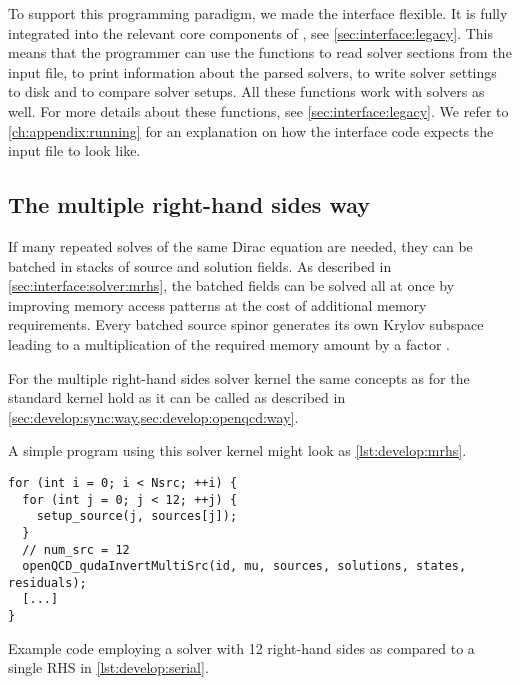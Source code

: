 To support this programming paradigm, we made the interface flexible. %
It is fully integrated into the relevant core components of \openqxd, see \cref{sec:interface:legacy}.
This means that the programmer can use the functions  to read solver sections from the input file,  to print information about the parsed solvers,  to write solver settings to disk and  to compare solver setups.
All these functions work with \quda solvers as well.
For more details about these functions, see \cref{sec:interface:legacy}.
We refer to \cref{ch:appendix:running} for an explanation on how the \quda interface code expects the input file to look like.

\subsection{The multiple right-hand sides way}
\label{sec:develop:mrhs:way}

If many repeated solves of the same Dirac equation are needed, they can be batched in stacks of  source and solution fields.
As described in \cref{sec:interface:solver:mrhs}, the batched fields can be solved all at once by improving memory access patterns at the cost of additional memory requirements.
Every batched source spinor generates its own Krylov subspace leading to a multiplication of the required memory amount by a factor .

For the multiple right-hand sides solver kernel the same concepts as for the standard kernel hold as it can be called as described in \cref{sec:develop:sync:way,sec:develop:openqcd:way}.

A simple program using this solver kernel might look as \cref{lst:develop:mrhs}.
\begin{codelisting}
\begin{verbatim}
for (int i = 0; i < Nsrc; ++i) {
  for (int j = 0; j < 12; ++j) {
    setup_source(j, sources[j]);
  }
  // num_src = 12
  openQCD_qudaInvertMultiSrc(id, mu, sources, solutions, states, residuals);
  [...]
}
\end{verbatim}
\caption{Example code employing a solver with \num{12} right-hand sides as compared to a single RHS in \cref{lst:develop:serial}.}
\label{lst:develop:mrhs}
\end{codelisting}

